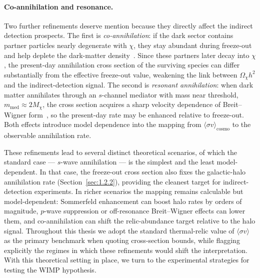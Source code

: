\paragraph{Co-annihilation and resonance.}
Two further refinements deserve mention because they directly affect the indirect detection prospects.
The first is \emph{co-annihilation}: if the dark sector contains partner particles nearly degenerate with $\chi$, they stay abundant during freeze-out and help deplete the dark-matter density~\cite{Ellis:1983ew,Griest:1990kh}.
Since these partners later decay into $\chi$, the present-day annihilation cross section of the surviving species can differ substantially from the effective freeze-out value, weakening the link between $\Omega_\chi h^2$ and the indirect-detection signal.
The second is \emph{resonant annihilation}: when dark matter annihilates through an $s$-channel mediator with mass near threshold, $m_\mathrm{med}\approx 2 M_\chi$, the cross section acquires a sharp velocity dependence of Breit--Wigner form~\cite{Griest:1990kh,Gondolo:1990dk}, so the present-day rate may be enhanced relative to freeze-out.
Both effects introduce model dependence into the mapping from $\langle\sigma v\rangle_\mathrm{cosmo}$ to the observable annihilation rate.

These refinements lead to several distinct theoretical scenarios, of which the standard case --- $s$-wave annihilation --- is the simplest and the least model-dependent.
In that case, the freeze-out cross section also fixes the galactic-halo annihilation rate (Section~\ref{sec:1.2.2}), providing the cleanest target for indirect-detection experiments.
In richer scenarios the mapping remains calculable but model-dependent: Sommerfeld enhancement can boost halo rates by orders of magnitude, $p$-wave suppression or off-resonance Breit--Wigner effects can lower them, and co-annihilation can shift the relic-abundance target relative to the halo signal.
Throughout this thesis we adopt the standard thermal-relic value of $\langle\sigma v\rangle$ as the primary benchmark when quoting cross-section bounds, while flagging explicitly the regimes in which these refinements would shift the interpretation.
With this theoretical setting in place, we turn to the experimental strategies for testing the WIMP hypothesis.
